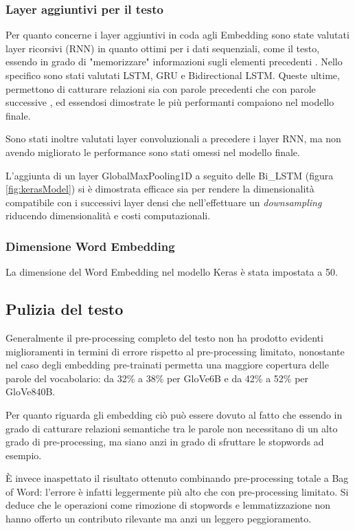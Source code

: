 \subsubsection{Layer aggiuntivi per il testo}

Per quanto concerne i layer aggiuntivi in coda agli Embedding sono state
valutati layer ricorsivi (RNN) in quanto ottimi per i dati sequenziali, come il
testo, essendo in grado di "memorizzare" informazioni sugli elementi precedenti
\cite{liang2017text}. Nello specifico sono stati valutati LSTM, GRU e
Bidirectional LSTM. Queste ultime, permettono di catturare relazioni sia con
parole precedenti che con parole successive \cite{schuster1997bidirectional}, ed
essendosi dimostrate le più performanti compaiono nel modello finale.

Sono stati inoltre valutati layer convoluzionali a precedere i layer RNN, ma non
avendo migliorato le performance sono stati omessi nel modello finale.

L'aggiunta di un layer GlobalMaxPooling1D a seguito delle Bi\_LSTM (figura
\ref{fig:kerasModel}) si è dimostrata efficace sia per rendere la dimensionalità
compatibile con i successivi layer densi che nell'effettuare un
\textit{downsampling} riducendo dimensionalità e costi computazionali.

\subsubsection{Dimensione Word Embedding}
La dimensione del Word Embedding nel modello Keras è stata impostata a 50.

\subsection{Pulizia del testo}

Generalmente il pre-processing completo del testo non ha prodotto evidenti
miglioramenti in termini di errore rispetto al pre-processing limitato,
nonostante nel caso degli embedding pre-trainati permetta una maggiore copertura
delle parole del vocabolario: da 32\% a 38\% per GloVe6B e da 42\% a 52\% per
GloVe840B.

Per quanto riguarda gli embedding ciò può essere dovuto al fatto che essendo in
grado di catturare relazioni semantiche tra le parole non necessitano di un alto
grado di pre-processing, ma siano anzi in grado di sfruttare le stopwords ad esempio.

È invece inaspettato il risultato ottenuto combinando pre-processing totale a Bag
of Word: l'errore è infatti leggermente più alto che con pre-processing
limitato. Si deduce che le operazioni come rimozione di stopwords e
lemmatizzazione non hanno offerto un contributo rilevante ma anzi un leggero
peggioramento. 


